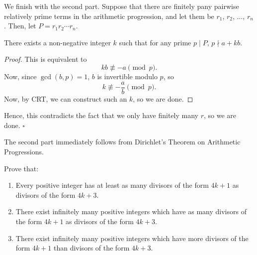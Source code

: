 \documentclass{article}
\begin{document}
We finish with the second part. Suppose that there are finitely pany pairwise relatively prime terms in the arithmetic progression, and let them be $r_1$, $r_2$, $\dots$, $r_n$. Then, let $P = r_1r_2\cdots r_n$.
\begin{claim*}
There exists a non-negative integer $k$ such that for any prime $p \mid P$, $p \nmid a+kb$.
\end{claim*}
\begin{proof}
This is equivalent to \[kb \not\equiv -a \pmod{p}.\] Now, since $\gcd(b, p) = 1$, $b$ is invertible modulo $p$, so \[k \not\equiv -\dfrac{a}{b} \pmod{p}.\] Now, by CRT, we can construct such an $k$, so we are done.
\end{proof}
Hence, this contradicts the fact that we only have finitely many $r$, so we are done. $\square$

\begin{remark*}
The second part immediately follows from Dirichlet's Theorem on Arithmetic Progressions.
\end{remark*}

\begin{problem}[2.14.9]{}
Prove that:
\begin{enumerate}
\item Every positive integer has at least as many divisors of the form $4k + 1$ as divisors of the
form $4k + 3$.
\item There exist infinitely many positive integers which have as many divisors of the form
$4k + 1$ as divisors of the form $4k + 3$.
\item There exist infinitely many positive integers which have more divisors of the form $4k+1$
than divisors of the form $4k + 3$.
\end{enumerate}
\end{problem}
\end{document}
